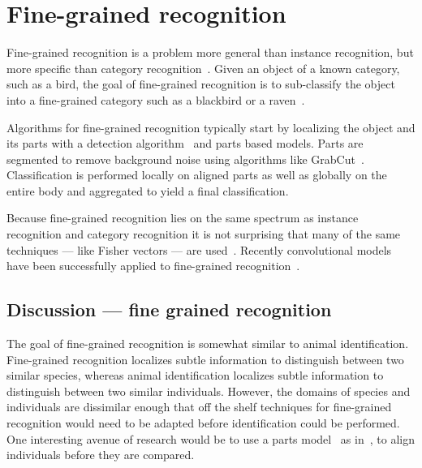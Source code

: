 \section{Fine-grained recognition}\label{sec:fgr}  

    Fine-grained recognition is a problem more general than instance recognition, but more specific than category
    recognition~\cite{parkhi_cats_2012, berg_poof_2013, gavves_local_2014}. Given an object of a known category,
    such as a bird, the goal of fine-grained recognition is to sub-classify the object into a fine-grained category
    such as a blackbird or a raven~\cite{berg_how_2013}.

    Algorithms for fine-grained recognition typically start by localizing the object and its parts with a detection
    algorithm~\cite{dalal_histograms_2005} and parts based models. Parts are segmented to remove background noise
    using algorithms like GrabCut~\cite{rother_grabcut_2004}. Classification is performed locally on aligned parts
    as well as globally on the entire body and aggregated to yield a final classification.

    Because fine-grained recognition lies on the same spectrum as instance recognition and category recognition it
    is not surprising that many of the same techniques --- like Fisher vectors --- are
    used~\cite{gosselin_revisiting_2014}.
    Recently convolutional models have been successfully applied to fine-grained
    recognition~\cite{catherine_wah_similarity_2014, branson_bird_2014, zongyuan_ge_modelling_2015,
    zhang_weakly_2015, xiao_application_2015}.


    \subsection{Discussion --- fine grained recognition}
        The goal of fine-grained recognition is somewhat similar to animal identification. Fine-grained recognition
        localizes subtle information to distinguish between two similar species, whereas animal identification
        localizes subtle information to distinguish between two similar individuals. However, the domains of
        species and individuals are dissimilar enough that off the shelf techniques for fine-grained recognition
        would need to be adapted before identification could be performed. One interesting avenue of research would
        be to use a parts model~\cite{felzenszwalb_object_2010} as in~\cite{gavves_local_2014}, to align
          individuals before they are compared.
